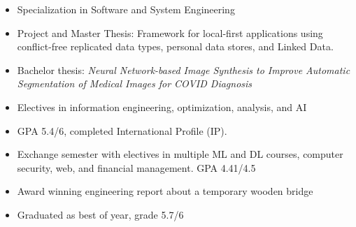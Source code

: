 
\vspace*{-4pt}



\begin{itemize}
  \item Specialization in Software and System Engineering 
  \item Project and Master Thesis: Framework for local-first applications using conflict-free replicated data types, personal data stores, and Linked Data. 
\end{itemize}

\medskip


\begin{itemize}
  \item Bachelor thesis: \textit{Neural Network-based Image Synthesis to Improve Automatic Segmentation of Medical Images for COVID Diagnosis}
  \item Electives in information engineering, optimization, analysis, and AI
  \item GPA 5.4/6, completed International Profile (IP).
\end{itemize}


\begin{itemize}
  \item Exchange semester with electives in multiple ML and DL courses, computer security, web, and financial management. GPA 4.41/4.5
\end{itemize}

\medskip


\begin{itemize}
  \item Award winning engineering report about a temporary wooden bridge
  \item Graduated as best of year, grade 5.7/6
\end{itemize}


